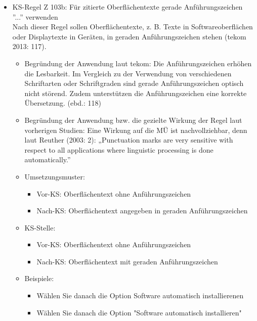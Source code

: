 \documentclass[output=paper]{langscibook}
\begin{document}
\clearpage
\begin{itemize}
\item[]KS-Regel Z 103b:  Für zitierte Oberflächentexte gerade Anführungszeichen ''...'' verwenden\\
Nach dieser Regel sollen Oberflächentexte, z. B. Texte in Softwareoberflächen oder Displaytexte in Geräten, in geraden Anführungszeichen stehen (tekom 2013: 117).
\begin{itemize}
    \item[]Begründung der Anwendung laut tekom: Die Anführungszeichen erhöhen die Lesbarkeit. Im Vergleich zu der Verwendung von verschiedenen Schriftarten oder Schriftgraden sind gerade Anführungszeichen optisch nicht störend. Zudem unterstützen die Anführungszeichen eine korrekte Übersetzung. (ebd.: 118)
    \item[]Begründung der Anwendung bzw. die gezielte Wirkung der Regel laut vorherigen Studien: Eine Wirkung auf die MÜ ist nachvollziehbar, denn laut Reuther (2003: 2): „Punctuation marks are very sensitive with respect to all applications where linguistic processing is done automatically.”
    \item[] Umsetzungsmuster:
        \begin{itemize}
            \item[] Vor-KS: Oberflächentext ohne Anführungszeichen
            \item[] Nach-KS: Oberflächentext angegeben in geraden Anführungszeichen
        \end{itemize}
     \item[] KS-Stelle:
        \begin{itemize}
            \item[] Vor-KS: Oberflächentext ohne Anführungszeichen
            \item[] Nach-KS: Oberflächentext mit geraden Anführungszeichen
        \end{itemize}
    \item[] Beispiele:
        \begin{itemize}
            \item[] Wählen Sie danach die Option Software automatisch installierenen
            \item[] Wählen Sie danach die Option "Software automatisch installieren"
        \end{itemize}

\end{itemize}

\end{itemize}
\end{document}
